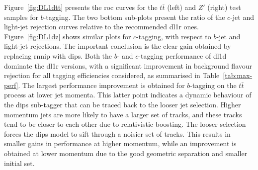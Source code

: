 Figure~\ref{fig:DL1dtt} presents the \gls{roc} curves for the $t\bar{t}$ (left) and $Z'$ (right) test samples for $b$-tagging. The two bottom sub-plots present the ratio of the $c$-jet and light-jet rejection curves relative to the recommended \gls{dl1r} ones. Figure~\ref{fig:DL1dz} shows similar plots for $c$-tagging, with respect to $b$-jet and light-jet rejections. The important conclusion is the clear gain obtained by replacing \gls{rnnip} with \gls{dips}. Both the $b$- and $c$-tagging performance of \gls{dl1d} dominate the \gls{dl1r} versions, with a significant improvement in background flavour rejection for all tagging efficiencies considered, as summarised in Table~\ref{tab:max-perf}. The largest performance improvement is obtained for $b$-tagging on the $t\bar{t}$ process at lower jet momenta. This latter point indicates a dynamic behaviour of the \gls{dips} sub-tagger that can be traced back to the looser jet selection. Higher momentum jets are more likely to have a larger set of tracks, and these tracks tend to be closer to each other due to relativistic boosting. The looser selection forces the \gls{dips} model to sift through a noisier set of tracks. This results in smaller gains in performance at higher momentum, while an improvement is obtained at lower momentum due to the good geometric separation and smaller initial set. 

